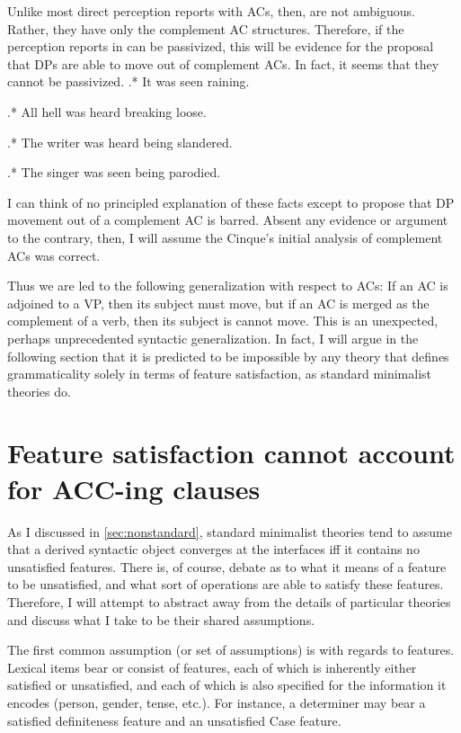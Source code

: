 \documentclass[MilwayThesis]{subfiles}
\begin{document}
Unlike most direct perception reports with ACs, then,  are not ambiguous.
Rather, they have only the complement AC structures.
Therefore, if the perception reports in  can be passivized, this will be evidence for the proposal that DPs are able to move out of complement ACs.
In fact, it seems that they cannot be passivized.
\ex.* It was seen raining.

\ex.* All hell was heard breaking loose.

\ex.* The writer was heard being slandered.

\ex.* The singer was seen being parodied.

I can think of no principled explanation of these facts except to propose that DP movement out of a complement AC is barred.
Absent any evidence or argument to the contrary, then, I will assume the Cinque's initial analysis of complement ACs was correct.

Thus we are led to the following generalization with respect to ACs:
If an AC is adjoined to a VP, then its subject must move, but if an AC is merged as the complement of a verb, then its subject is cannot move.
This is an unexpected, perhaps unprecedented syntactic generalization.
In fact, I will argue in the following section that it is predicted to be impossible by any theory that defines grammaticality solely in terms of feature satisfaction, as standard minimalist theories do.
\section{Feature satisfaction cannot account for ACC-ing clauses}
As I discussed in \cref{sec:nonstandard}, standard minimalist theories tend to assume that a derived syntactic object converges at the interfaces iff it contains no unsatisfied features.
There is, of course, debate as to what it means of a feature to be unsatisfied, and what sort of operations are able to satisfy these features.
Therefore, I will attempt to abstract away from the details of particular theories and discuss what I take to be their shared assumptions.

The first common assumption (or set of assumptions) is with regards to features.
Lexical items bear or consist of features, each of which is inherently either satisfied or unsatisfied, and each of which is also specified for the information it encodes (person, gender, tense, etc.).
For instance, a determiner may bear a satisfied definiteness feature and an unsatisfied Case feature.
\end{document}
